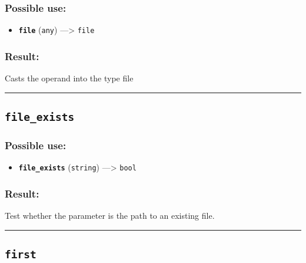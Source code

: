 \documentclass[]{book}
\providecommand{\tightlist}{%
  \setlength{\itemsep}{0pt}\setlength{\parskip}{0pt}}
\theoremstyle{definition}
\theoremstyle{definition}
\theoremstyle{definition}
\theoremstyle{remark}
\begin{document}
\subsubsection{Possible use:}\label{possible-use-165}

\begin{itemize}
\tightlist
\item
  \textbf{\texttt{file}} (\texttt{any}) ---\textgreater{} \texttt{file}
\end{itemize}

\subsubsection{Result:}\label{result-159}

Casts the operand into the type file

\begin{center}\rule{0.5\linewidth}{\linethickness}\end{center}

\subsection{\texorpdfstring{\texttt{file\_exists}}{file\_exists}}\label{file_exists}

\subsubsection{Possible use:}\label{possible-use-166}

\begin{itemize}
\tightlist
\item
  \textbf{\texttt{file\_exists}} (\texttt{string}) ---\textgreater{}
  \texttt{bool}
\end{itemize}

\subsubsection{Result:}\label{result-160}

Test whether the parameter is the path to an existing file.

\begin{center}\rule{0.5\linewidth}{\linethickness}\end{center}

\subsection{\texorpdfstring{\texttt{first}}{first}}\label{first}
\end{document}
